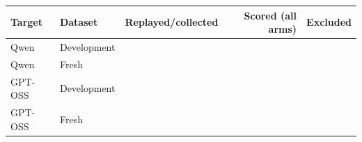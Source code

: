 \begin{tabular}{llrrr}
\toprule
Target & Dataset & Replayed/collected & Scored (all arms) & Excluded \\
\midrule
Qwen & Development & \qwenDevelopmentCollectionOrReplayedEpisodes{} & \qwenDevelopmentScoredEpisodesAllConditions{} & \qwenDevelopmentExcluded{} \\
Qwen & Fresh & \qwenFreshCollectionOrReplayedEpisodes{} & \qwenFreshScoredEpisodesAllConditions{} & \qwenFreshExcluded{} \\
GPT-OSS & Development & \gptossDevelopmentCollectionOrReplayedEpisodes{} & \gptossDevelopmentScoredEpisodesAllConditions{} & \gptossDevelopmentExcluded{} \\
GPT-OSS & Fresh & \gptossFreshCollectionOrReplayedEpisodes{} & \gptossFreshScoredEpisodesAllConditions{} & \gptossFreshExcluded{} \\
\bottomrule
\end{tabular}
